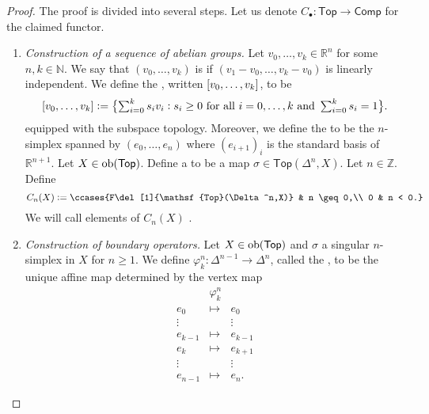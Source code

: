 \begin{proof}
	The proof is divided into several steps. Let us denote $C_\bullet : \mathsf{Top} \to \mathsf{Comp}$ for the claimed functor.
	\begin{enumerate}[label = \textit{Step \arabic*:},wide = 0pt, itemsep = 1.5ex]
		\item \textit{Construction of a sequence of abelian groups.} Let $v_0,\dots,v_k \in \mathbb{R}^n$ for some $n,k \in \mathbb{N}$. We say that $(v_0,\dots,v_k)$ is  if $(v_1 - v_0,\dots, v_k - v_0)$ is linearly independent. We define the , written $\sbr[0]{v_0,\dots,v_k}$, to be
			\begin{equation}
				\textstyle{\sbr[0]{v_0,\dots,v_k} := \cbr[1]{\sum_{i = 0}^k s_i v_i : s_i \geq 0 \text{ for all } i = 0,\dots,k \text{ and } \sum_{i = 0}^k s_i = 1}}.
			\end{equation}
			\noindent equipped with the subspace topology. Moreover, we define the  to be the $n$-simplex spanned by $(e_0,\dots,e_n)$ where $(e_{i + 1})_i$ is the standard basis of $\mathbb{R}^{n+1}$. Let $X \in \operatorname{ob}(\mathsf{Top})$. Define a  to be a map $\sigma \in \mathsf{Top}(\Delta^n,X)$. Let $n \in \mathbb{Z}$. Define
			\begin{equation}
				C_n(X) := \ccases{F\del[1]{\mathsf{Top}(\Delta^n,X)} & n \geq 0,\\
									0 & n < 0.}
			\end{equation}
			We will call elements of $C_n(X)$ .
		\item \textit{Construction of boundary operators.} Let $X \in \operatorname{ob}(\mathsf{Top})$ and $\sigma$ a singular $n$-simplex in $X$ for $n \geq 1$. We define $\varphi^n_k : \Delta^{n-1} \to \Delta^n$, called the , to be the unique affine map determined by the vertex map
			\begin{equation*}
				\begin{matrix}
					& \varphi_k^n\\
					e_0 & \mapsto & e_0\\
					\vdots & & \vdots\\
					e_{k - 1} & \mapsto & e_{k - 1}\\
					e_k & \mapsto & e_{k + 1}\\
					\vdots & & \vdots\\
					e_{n - 1} & \mapsto & e_n.
				\end{matrix}

\end{equation*}
\end{enumerate}
\end{proof}

